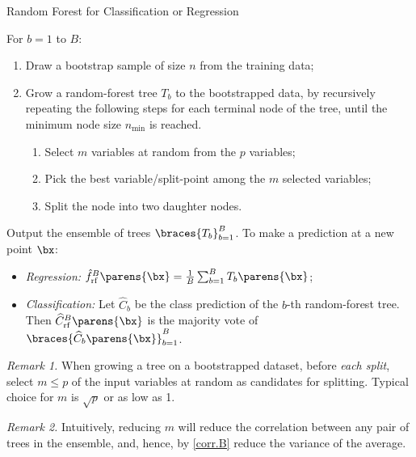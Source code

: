 \documentclass[12pt]{article}
\begin{document}
\begin{enumerate}[label=\textbf{\arabic*.}]
	\begin{minipage}{\linewidth}
	\begin{algorithm}[H]
		\caption{Random Forest for Classification or Regression}\label{algo-random-forest}
		\begin{algorithmic}[1]
		\STATE For $ b = 1 $ to $B$: 
		\begin{enumerate}
			\item Draw a bootstrap sample of size $n$ from the training data; 
			\item Grow a random-forest tree $T_b$ to the bootstrapped data, by recursively repeating the following steps for each terminal node of the tree, until the minimum node size $n_{\mathrm{min}}$ is reached. 
			\begin{enumerate}
				\item Select $m$ variables at random from the $p$ variables; 
				\item Pick the best variable/split-point among the $m$ selected variables; 
				\item Split the node into two daughter nodes. 
			\end{enumerate}
		\end{enumerate}
		\STATE Output the ensemble of trees $\braces{T_b}_{b=1}^B$. 
		\STATE To make a prediction at a new point $\bx$: 
		\begin{itemize}
			\item \textit{Regression:} $\hat{f}^B_{\text{rf}} \parens{\bx} = \frac{1}{B} \sum_{b=1}^B T_b \parens{\bx}$; 
			\item \textit{Classification:} Let $\widehat{C}_b$ be the class prediction of the $b$-th random-forest tree. Then $\widehat{C}_{\text{rf}}^B \parens{\bx}$ is the majority vote of $\braces{\widehat{C}_b \parens{\bx}}_{b=1}^B$. 
		\end{itemize}
		\end{algorithmic}
	\end{algorithm}
	\end{minipage}
	
	\vspace{10pt}
	
	\textit{Remark 1.} When growing a tree on a bootstrapped dataset, before \emph{each split}, select $m \le p$ of the input variables at random as candidates for splitting. Typical choice for $m$ is $\sqrt{p}$ or as low as 1. 
	
	\textit{Remark 2.} Intuitively, reducing $m$ will reduce the correlation between any pair of trees in the ensemble, and, hence, by \eqref{corr.B} reduce the variance of the average. 
	

\end{enumerate}
\end{document}
